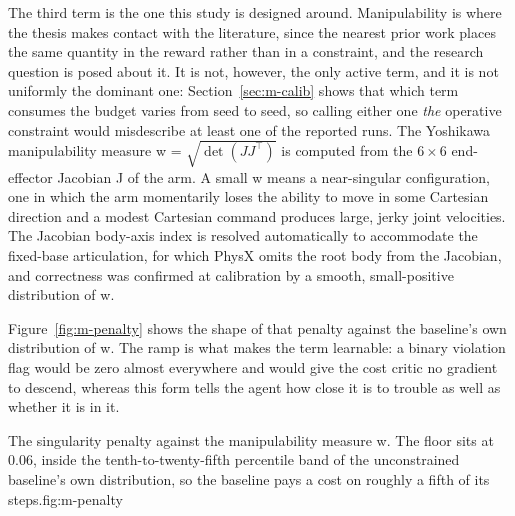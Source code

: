 The third term is the one this study is designed around. Manipulability is where the thesis makes
contact with the literature, since the nearest prior work places the same quantity in the reward
rather than in a constraint, and the research question is posed about it. It is not, however, the
only active term, and it is not uniformly the dominant one: Section~\ref{sec:m-calib} shows that
which term consumes the budget varies from seed to seed, so calling either one \emph{the} operative
constraint would misdescribe at least one of the reported runs. The Yoshikawa manipulability measure
w = \(\sqrt{\det(JJ^{\top})}\) \cite{yoshikawa1985manipulability} is computed from the
\(6\times6\) end-effector Jacobian J of the arm. A small w means a near-singular configuration, one
in which the arm momentarily loses the ability to move in some Cartesian direction and a modest
Cartesian command produces large, jerky joint velocities. The Jacobian body-axis index is resolved
automatically to accommodate the fixed-base articulation, for which PhysX omits the root body from
the Jacobian, and correctness was confirmed at calibration by a smooth, small-positive distribution
of w.

Figure~\ref{fig:m-penalty} shows the shape of that penalty against the baseline's own distribution of
w. The ramp is what makes the term learnable: a binary violation flag would be zero almost
everywhere and would give the cost critic no gradient to descend, whereas this form tells the agent
how close it is to trouble as well as whether it is in it.

\begin{kuetfigure}{The singularity penalty against the manipulability measure w. The floor sits
at 0.06, inside the tenth-to-twenty-fifth percentile band of the unconstrained baseline's own
distribution, so the baseline pays a cost on roughly a fifth of its steps.}{fig:m-penalty}
\end{kuetfigure}

